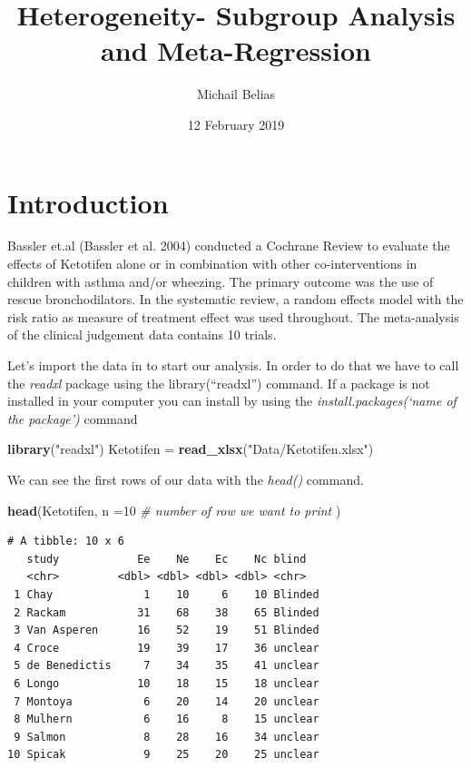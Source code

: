\documentclass[]{article}
\title{Heterogeneity- Subgroup Analysis and Meta-Regression}
\author{Michail Belias}
\date{12 February 2019}
\newenvironment{Shaded}{\begin{snugshade}}{\end{snugshade}}
\newcommand{\CommentTok}[1]{\textcolor[rgb]{0.56,0.35,0.01}{\textit{#1}}}
\newcommand{\DataTypeTok}[1]{\textcolor[rgb]{0.13,0.29,0.53}{#1}}
\newcommand{\DecValTok}[1]{\textcolor[rgb]{0.00,0.00,0.81}{#1}}
\newcommand{\KeywordTok}[1]{\textcolor[rgb]{0.13,0.29,0.53}{\textbf{#1}}}
\newcommand{\NormalTok}[1]{#1}
\newcommand{\StringTok}[1]{\textcolor[rgb]{0.31,0.60,0.02}{#1}}
\begin{document}
\maketitle

\hypertarget{introduction}{%
\section{Introduction}\label{introduction}}

Bassler et.al (Bassler et al. 2004) conducted a Cochrane Review to
evaluate the effects of Ketotifen alone or in combination with other
co-interventions in children with asthma and/or wheezing. The primary
outcome was the use of rescue bronchodilators. In the systematic review,
a random effects model with the risk ratio as measure of treatment
effect was used throughout. The meta-analysis of the clinical judgement
data contains 10 trials.

Let's import the data in to start our analysis. In order to do that we
have to call the \emph{readxl} package using the library(``readxl'')
command. If a package is not installed in your computer you can install
by using the \emph{install.packages(`name of the package')} command

\begin{Shaded}
\begin{Highlighting}[]
\KeywordTok{library}\NormalTok{(}\StringTok{"readxl"}\NormalTok{)}
\NormalTok{Ketotifen =}\StringTok{  }\KeywordTok{read_xlsx}\NormalTok{(}\StringTok{"Data/Ketotifen.xlsx"}\NormalTok{)}
\end{Highlighting}
\end{Shaded}

We can see the first rows of our data with the \emph{head()} command.

\begin{Shaded}
\begin{Highlighting}[]
\KeywordTok{head}\NormalTok{(Ketotifen, }
     \DataTypeTok{n =}\DecValTok{10} \CommentTok{# number of row we want to print}
\NormalTok{     )}
\end{Highlighting}
\end{Shaded}

\begin{verbatim}
# A tibble: 10 x 6
   study            Ee    Ne    Ec    Nc blind  
   <chr>         <dbl> <dbl> <dbl> <dbl> <chr>  
 1 Chay              1    10     6    10 Blinded
 2 Rackam           31    68    38    65 Blinded
 3 Van Asperen      16    52    19    51 Blinded
 4 Croce            19    39    17    36 unclear
 5 de Benedictis     7    34    35    41 unclear
 6 Longo            10    18    15    18 unclear
 7 Montoya           6    20    14    20 unclear
 8 Mulhern           6    16     8    15 unclear
 9 Salmon            8    28    16    34 unclear
10 Spicak            9    25    20    25 unclear
\end{verbatim}
\end{document}
